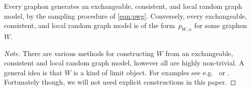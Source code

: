 
\begin{proposition}[\hspace{1sp}\cite{lovasz-2006}, {\cite[\S11.2]{MR3012035}}]%
  \label{prop:lovasz}
  Every graphon generates an exchangeable, consistent, and local random
  graph model, by the sampling procedure of \eqref{eqn:pwg}.
  Conversely, every exchangeable, consistent, and local random graph
  model is of the form~$p_{W,n}$ for some graphon~$W$.
\end{proposition}
\begin{proof}[Note]
 There are various methods for constructing $W$ from an exchangeable, consistent and local random graph model, however all are highly non-trivial. A general idea is that $W$ is a kind of limit object. For examples see e.g.~\cite[\S11.3]{lovasz-2006} or \cite{tao-graphons}. Fortunately though, we will not need explicit constructions in this paper. 
\end{proof}

